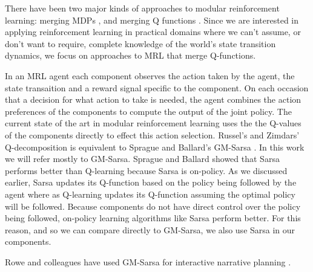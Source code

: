 There have been two major kinds of approaches to modular reinforcement learning: merging MDPs \cite{singh1998how-to-dynamically}, and merging Q functions \cite{sprague2003multiple-goal,russell2003q-decomposition}. Since we are interested in applying reinforcement learning in practical domains where we can't assume, or don't want to require, complete knowledge of the world's state transition dynamics, we focus on approaches to MRL that merge Q-functions.

In an MRL agent each component observes the action taken by the agent, the state transaition and a reward signal specific to the component. On each occasion that a decision for what action to take is needed, the agent combines the action preferences of the components to compute the output of the joint policy.  The current state of the art in modular reinforcement learning uses the the Q-values of the components directly to effect this action selection. Russel's and Zimdars' Q-decomposition \cite{russel2003q-decomposition} is equivalent to Sprague and Ballard's GM-Sarsa \cite{sprague2003multiple-goal}. In this work we will refer mostly to GM-Sarsa. Sprague and Ballard showed that Sarsa performs better than Q-learning because Sarsa is on-policy. As we discussed earlier, Sarsa updates its Q-function based on the policy being followed by the agent where as Q-learning updates its Q-function assuming the optimal policy will be followed. Because components do not have direct control over the policy being followed, on-policy learning algorithms like Sarsa perform better. For this reason, and so we can compare directly to GM-Sarsa, we also use Sarsa in our components.



Rowe and colleagues have used GM-Sarsa for interactive narrative planning \cite{rowe2013modular}.
